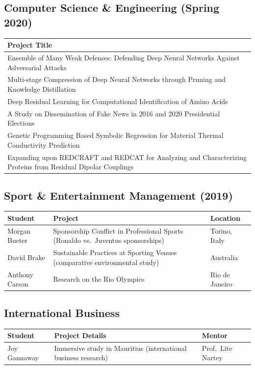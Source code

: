 \documentclass[11pt, letterpaper]{article}
\begin{document}
\subsection{Computer Science \& Engineering (Spring 2020)}

\begin{longtable}{@{}p{14cm}@{}}
\toprule
\textbf{Project Title} \\
\midrule
\endhead
Ensemble of Many Weak Defenses: Defending Deep Neural Networks Against Adversarial Attacks \\
Multi-stage Compression of Deep Neural Networks through Pruning and Knowledge Distillation \\
Deep Residual Learning for Computational Identification of Amino Acids \\
A Study on Dissemination of Fake News in 2016 and 2020 Presidential Elections \\
Genetic Programming Based Symbolic Regression for Material Thermal Conductivity Prediction \\
Expanding upon REDCRAFT and REDCAT for Analyzing and Characterizing Proteins from Residual Dipolar Couplings \\
\bottomrule
\end{longtable}

\subsection{Sport \& Entertainment Management (2019)}

\begin{longtable}{@{}p{3.5cm} p{7cm} p{3.5cm}@{}}
\toprule
\textbf{Student} & \textbf{Project} & \textbf{Location} \\
\midrule
\endhead
Morgan Bueter & Sponsorship Conflict in Professional Sports (Ronaldo vs.\ Juventus sponsorships) & Torino, Italy \\
David Brake & Sustainable Practices at Sporting Venues (comparative environmental study) & Australia \\
Anthony Carson & Research on the Rio Olympics & Rio de Janeiro \\
\bottomrule
\end{longtable}

\subsection{International Business}

\begin{longtable}{@{}p{3.5cm} p{7.5cm} p{3.5cm}@{}}
\toprule
\textbf{Student} & \textbf{Project Details} & \textbf{Mentor} \\
\midrule
\endhead
Joy Gannaway & Immersive study in Mauritius (international business research) & Prof.\ Lite Nartey \\
\bottomrule
\end{longtable}
\end{document}
